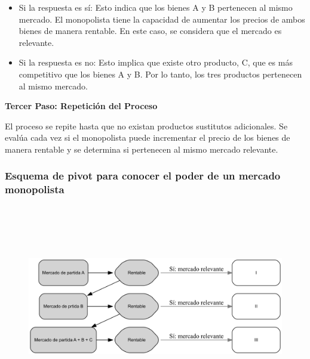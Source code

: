 \documentclass[
  a4paper,
]{article}
\theoremstyle{definition}
\theoremstyle{remark}
\begin{document}
\begin{itemize}
\item
  Si la respuesta es sí: Esto indica que los bienes A y B pertenecen al
  mismo mercado. El monopolista tiene la capacidad de aumentar los
  precios de ambos bienes de manera rentable. En este caso, se considera
  que el mercado es relevante.
\item
  Si la respuesta es no: Esto implica que existe otro producto, C, que
  es más competitivo que los bienes A y B. Por lo tanto, los tres
  productos pertenecen al mismo mercado.
\end{itemize}

\textbf{Tercer Paso: Repetición del Proceso}

El proceso se repite hasta que no existan productos sustitutos
adicionales. Se evalúa cada vez si el monopolista puede incrementar el
precio de los bienes de manera rentable y se determina si pertenecen al
mismo mercado relevante.

\hypertarget{esquema-de-pivot-para-conocer-el-poder-de-un-mercado-monopolista}{%
\subsubsection{Esquema de pivot para conocer el poder de un mercado
monopolista}\label{esquema-de-pivot-para-conocer-el-poder-de-un-mercado-monopolista}}

\begin{figure}[H]

{\centering \includegraphics[width=5.5in,height=3.5in]{index_files/figure-latex/dot-figure-1.png}

}

\end{figure}
\end{document}
